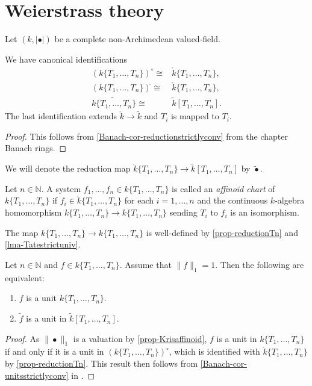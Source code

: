 \section{Weierstrass theory}
Let $(k,|\bullet|)$ be a complete non-Archimedean valued-field.

\begin{proposition}\label{prop-reductionTn}
    We have canonical identifications
    \[
        \begin{aligned}
        (k\{T_1,\ldots,T_n\} )^{\circ}\cong & \mathring{k}\{T_1,\ldots,T_n\},\\
        (k\{T_1,\ldots,T_n\} )^{\check{}}\cong & \check{k}\{T_1,\ldots,T_n\},\\
        \widetilde{k\{T_1,\ldots,T_n\}  }\cong & \tilde{k}[T_1,\ldots,T_n].
        \end{aligned}
    \]
    The last identification extends $\mathring{k}\rightarrow \tilde{k}$ and $T_i$ is mapped to $T_i$.
\end{proposition}
\begin{proof}
    This follows from \cref{Banach-cor-reductionstrictlyconv} from the chapter Banach rings.
\end{proof}
We will denote the reduction map $\mathring{k}\{T_1,\ldots,T_n\}\rightarrow \tilde{k}[T_1,\ldots,T_n]$ by $\tilde{\bullet}$.

\begin{definition}\label{def-affchart}
    Let $n\in \mathbb{N}$. A system $f_1,\ldots,f_n\in k\{T_1,\ldots,T_n\}$ is called an \emph{affinoid chart} of $k\{T_1,\ldots,T_n\}$ if $f_i\in \mathring{k}\{T_1,\ldots,T_n\}$ for each $i=1,\ldots,n$ and the continuous $k$-algebra homomorphism $k\{T_1,\ldots,T_n\}\rightarrow k\{T_1,\ldots,T_n\}$ sending $T_i$ to $f_i$ is an isomorphism.
\end{definition}
The map $k\{T_1,\ldots,T_n\}\rightarrow k\{T_1,\ldots,T_n\}$ is well-defined by \cref{prop-reductionTn} and \cref{lma-Tatestrictuniv}.


\begin{lemma}\label{lma-unitsTate}
    Let $n\in \mathbb{N}$ and $f\in k\{T_1,\ldots,T_n\}$. Assume that $\|f\|_1=1$. Then the following are equivalent:
    \begin{enumerate}
        \item $f$ is a unit $k\{T_1,\ldots,T_n\}$.
        \item $\tilde{f}$ is a unit in $\tilde{k}[T_1,\ldots,T_n]$.
    \end{enumerate}
\end{lemma}
\begin{proof}
    As $\|\bullet\|_1$ is a valuation by \cref{prop-Krisaffinoid}, $f$ is a unit in $k\{T_1,\ldots,T_n\}$ if and only if it is a unit in $(k\{T_1,\ldots,T_n\} )^{\circ}$, which is identified with $\mathring{k}\{T_1,\ldots,T_n\}$ by \cref{prop-reductionTn}. This result then follows from \cref{Banach-cor-unitsstrictlyconv} in .
\end{proof}


